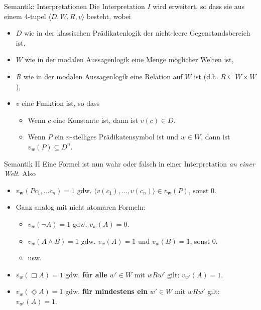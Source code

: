 \documentclass[12pt]{beamer}
\begin{document}
\begin{frame}{Semantik: Interpretationen}
  Die Interpretation $I$ wird erweitert, so dass sie aus einem 4-tupel
  $\langle D, W, R, v \rangle$ besteht, wobei \pause
  \begin{itemize}[<+->]
  \item $D$ wie in der klassischen Prädikatenlogik der nicht-leere
    Gegenstandsbereich ist,
  \item $W$ wie in der modalen Aussagenlogik eine Menge möglicher
    Welten ist,
  \item $R$ wie in der modalen Aussagenlogik eine Relation auf $W$ ist
    (d.h. $R \subseteq W \times W$),
  \item $v$ eine Funktion ist, so dass
    \begin{itemize}
    \item Wenn $c$ eine Konstante ist, dann ist $v(c) \in D$.
    \item Wenn $P$ ein $n$-stelliges Prädikatensymbol ist und
      $w \in W$, dann ist $v_w(P) \subseteq D^n$.
    \end{itemize}
  \end{itemize}
\end{frame}

\begin{frame}{Semantik II}
  Eine Formel ist nun wahr oder falsch in einer Interpretation
  \emph{an einer Welt}.  Also
  \begin{itemize}[<+->]
  \item $v_\mathbf{w}(Pc_1,...c_n) = 1$ gdw.
    $\langle v(c_1),...,v(c_n)\rangle \in v_\mathbf{w}(P)$, sonst 0.
  \item Ganz analog mit nicht atomaren Formeln:
    \begin{itemize}
    \item $v_w(\neg A) = 1$ gdw. $v_w(A) = 0$.
    \item $v_w(A \land B) = 1$ gdw. $v_w(A) = 1$ und $v_w(B) = 1$,
      sonst 0.
    \item usw.
    \end{itemize}
  \item $v_w(\Box A) = 1$ gdw. \textbf{für alle} $w' \in W$ mit $wRw'$
    gilt: $v_{w'}(A) = 1$.
  \item $v_w(\Diamond A) = 1$ gdw. \textbf{für mindestens ein}
    $w' \in W$ mit $wRw'$ gilt: $v_{w'}(A) = 1$.
  \end{itemize}
\end{frame}
\end{document}
